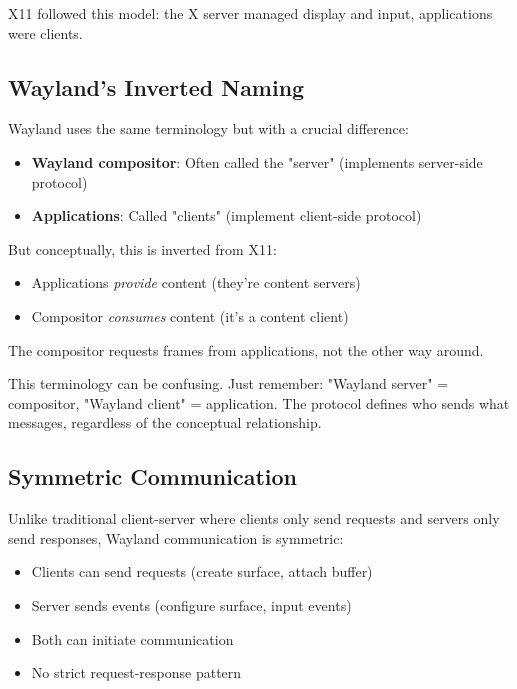 X11 followed this model: the X server managed display and input, applications were clients.

\subsection{Wayland's Inverted Naming}

Wayland uses the same terminology but with a crucial difference:
\begin{itemize}
    \item \textbf{Wayland compositor}: Often called the "server" (implements server-side protocol)
    \item \textbf{Applications}: Called "clients" (implement client-side protocol)
\end{itemize}

But conceptually, this is inverted from X11:
\begin{itemize}
    \item Applications \textit{provide} content (they're content servers)
    \item Compositor \textit{consumes} content (it's a content client)
\end{itemize}

The compositor requests frames from applications, not the other way around.

\begin{notebox}
This terminology can be confusing. Just remember: "Wayland server" = compositor, "Wayland client" = application. The protocol defines who sends what messages, regardless of the conceptual relationship.
\end{notebox}

\subsection{Symmetric Communication}

Unlike traditional client-server where clients only send requests and servers only send responses, Wayland communication is symmetric:

\begin{itemize}
    \item Clients can send requests (create surface, attach buffer)
    \item Server sends events (configure surface, input events)
    \item Both can initiate communication
    \item No strict request-response pattern
\end{itemize}

